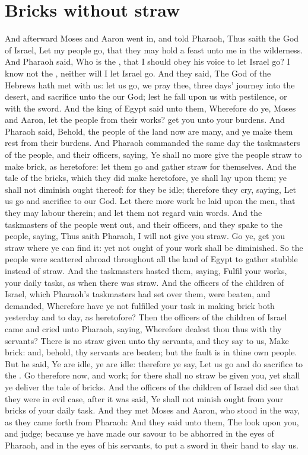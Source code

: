 \section*{Bricks without straw}
\begin{biblechapter} %
\verse And afterward Moses and Aaron went in, and told Pharaoh, Thus saith the \LORD God of Israel, Let my people go, that they may hold a feast unto me in the wilderness.
\verse And Pharaoh said, Who is the \LORD, that I should obey his voice to let Israel go? I know not the \LORD, neither will I let Israel go.
\verse And they said, The God of the Hebrews hath met with us: let us go, we pray thee, three days' journey into the desert, and sacrifice unto the \LORD our God; lest he fall upon us with pestilence, or with the sword.
\verse And the king of Egypt said unto them, Wherefore do ye, Moses and Aaron, let the people from their works? get you unto your burdens.
\verse And Pharaoh said, Behold, the people of the land now are many, and ye make them rest from their burdens.
\verse And Pharaoh commanded the same day the taskmasters of the people, and their officers, saying,
\verse Ye shall no more give the people straw to make brick, as heretofore: let them go and gather straw for themselves.
\verse And the tale of the bricks, which they did make heretofore, ye shall lay upon them; ye shall not diminish ought thereof: for they be idle; therefore they cry, saying, Let us go and sacrifice to our God.
\verse Let there more work be laid upon the men, that they may labour therein; and let them not regard vain words.
\verse And the taskmasters of the people went out, and their officers, and they spake to the people, saying, Thus saith Pharaoh, I will not give you straw.
\verse Go ye, get you straw where ye can find it: yet not ought of your work shall be diminished.
\verse So the people were scattered abroad throughout all the land of Egypt to gather stubble instead of straw.
\verse And the taskmasters hasted them, saying, Fulfil your works, your daily tasks, as when there was straw.
\verse And the officers of the children of Israel, which Pharaoh's taskmasters had set over them, were beaten, and demanded, Wherefore have ye not fulfilled your task in making brick both yesterday and to day, as heretofore?
\verse Then the officers of the children of Israel came and cried unto Pharaoh, saying, Wherefore dealest thou thus with thy servants?
\verse There is no straw given unto thy servants, and they say to us, Make brick: and, behold, thy servants are beaten; but the fault is in thine own people.
\verse But he said, Ye are idle, ye are idle: therefore ye say, Let us go and do sacrifice to the \LORD.
\verse Go therefore now, and work; for there shall no straw be given you, yet shall ye deliver the tale of bricks.
\verse And the officers of the children of Israel did see that they were in evil case, after it was said, Ye shall not minish ought from your bricks of your daily task.
\verse And they met Moses and Aaron, who stood in the way, as they came forth from Pharaoh:
\verse And they said unto them, The \LORD look upon you, and judge; because ye have made our savour to be abhorred in the eyes of Pharaoh, and in the eyes of his servants, to put a sword in their hand to slay us.

\end{biblechapter}
